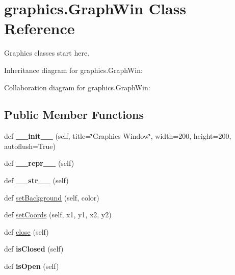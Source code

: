 \hypertarget{classgraphics_1_1GraphWin}{}\section{graphics.\+Graph\+Win Class Reference}
\label{classgraphics_1_1GraphWin}


Graphics classes start here.  




Inheritance diagram for graphics.\+Graph\+Win\+:


Collaboration diagram for graphics.\+Graph\+Win\+:
\subsection*{Public Member Functions}
\begin{DoxyCompactItemize}
\item 
def {\bfseries \+\_\+\+\_\+init\+\_\+\+\_\+} (self, title=\char`\"{}Graphics Window\char`\"{}, width=200, height=200, autoflush=True)\hypertarget{classgraphics_1_1GraphWin_abaf17e0a7d09fe97cbb23f03ca545339}{}\label{classgraphics_1_1GraphWin_abaf17e0a7d09fe97cbb23f03ca545339}

\item 
def {\bfseries \+\_\+\+\_\+repr\+\_\+\+\_\+} (self)\hypertarget{classgraphics_1_1GraphWin_afc6d29fa1772c46ec5f1c8917c0dfa36}{}\label{classgraphics_1_1GraphWin_afc6d29fa1772c46ec5f1c8917c0dfa36}

\item 
def {\bfseries \+\_\+\+\_\+str\+\_\+\+\_\+} (self)\hypertarget{classgraphics_1_1GraphWin_a47a25afdbc0a778241b364142caf862e}{}\label{classgraphics_1_1GraphWin_a47a25afdbc0a778241b364142caf862e}

\item 
def \hyperlink{classgraphics_1_1GraphWin_aec4e7921def91d795367eef63054a4df}{set\+Background} (self, color)
\item 
def \hyperlink{classgraphics_1_1GraphWin_a9f5ef08db39c026392b093c2d0a7fbe9}{set\+Coords} (self, x1, y1, x2, y2)
\item 
def \hyperlink{classgraphics_1_1GraphWin_a760daa823490308117c5ce3ea2946bfb}{close} (self)
\item 
def {\bfseries is\+Closed} (self)\hypertarget{classgraphics_1_1GraphWin_a77f97f64e8d3dddcef5d3c345ffedc6d}{}\label{classgraphics_1_1GraphWin_a77f97f64e8d3dddcef5d3c345ffedc6d}

\item 
def {\bfseries is\+Open} (self)\hypertarget{classgraphics_1_1GraphWin_a1a3732b58c2ffc8960be3a9f66bd4df8}{}\label{classgraphics_1_1GraphWin_a1a3732b58c2ffc8960be3a9f66bd4df8}


\end{DoxyCompactItemize}
